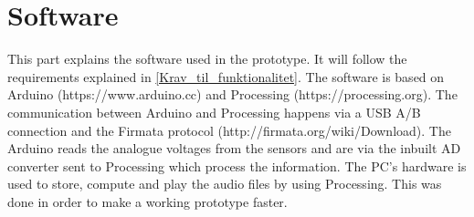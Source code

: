 \chapter{Software}
\label{software}
This part explains the software used in the prototype. It will follow the requirements explained in \autoref{Krav_til_funktionalitet}. The software is based on Arduino (https://www.arduino.cc) and Processing (https://processing.org). The communication between Arduino and Processing happens via a USB A/B connection and the Firmata protocol (http://firmata.org/wiki/Download). The Arduino reads the analogue voltages from the sensors and are via the inbuilt AD converter sent to Processing which process the information. The PC's hardware is used to store, compute and play the audio files by using Processing. This was done in order to make a working prototype faster. 

 

